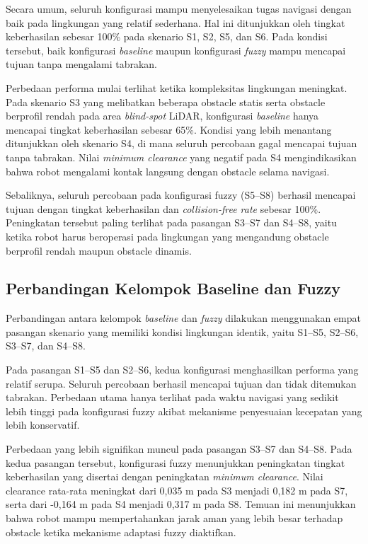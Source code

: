 Secara umum, seluruh konfigurasi mampu menyelesaikan tugas navigasi dengan baik pada lingkungan yang relatif sederhana. Hal ini ditunjukkan oleh tingkat keberhasilan sebesar 100\% pada skenario S1, S2, S5, dan S6. Pada kondisi tersebut, baik konfigurasi \textit{baseline} maupun konfigurasi \textit{fuzzy} mampu mencapai tujuan tanpa mengalami tabrakan.

Perbedaan performa mulai terlihat ketika kompleksitas lingkungan meningkat. Pada skenario S3 yang melibatkan beberapa obstacle statis serta obstacle berprofil rendah pada area \textit{blind-spot} LiDAR, konfigurasi \textit{baseline} hanya mencapai tingkat keberhasilan sebesar 65\%. Kondisi yang lebih menantang ditunjukkan oleh skenario S4, di mana seluruh percobaan gagal mencapai tujuan tanpa tabrakan. Nilai \textit{minimum clearance} yang negatif pada S4 mengindikasi\-kan bahwa robot mengalami kontak langsung dengan obstacle selama navigasi.

Sebaliknya, seluruh percobaan pada konfigurasi fuzzy (S5--S8) berhasil mencapai tujuan dengan tingkat keberhasilan dan \textit{collision-free rate} sebesar 100\%. Peningkatan tersebut paling terlihat pada pasangan S3--S7 dan S4--S8, yaitu ketika robot harus beroperasi pada lingkungan yang mengandung obstacle berprofil rendah maupun obstacle dinamis.

\subsection{Perbandingan Kelompok Baseline dan Fuzzy}

Perbandingan antara kelompok \textit{baseline} dan \textit{fuzzy} dilakukan menggunakan empat pasangan skenario yang memiliki kondisi lingkungan identik, yaitu S1--S5, S2--S6, S3--S7, dan S4--S8.

Pada pasangan S1--S5 dan S2--S6, kedua konfigurasi menghasilkan performa yang relatif serupa. Seluruh percobaan berhasil mencapai tujuan dan tidak ditemukan tabrakan. Perbedaan utama hanya terlihat pada waktu navigasi yang sedikit lebih tinggi pada konfigurasi fuzzy akibat mekanisme penyesuaian kecepatan yang lebih konservatif.

Perbedaan yang lebih signifikan muncul pada pasangan S3--S7 dan S4--S8. Pada kedua pasangan tersebut, konfigurasi fuzzy menunjukkan peningkatan tingkat keberhasilan yang disertai dengan peningkatan \textit{minimum clearance}. Nilai clearance rata-rata meningkat dari 0,035 m pada S3 menjadi 0,182 m pada S7, serta dari -0,164 m pada S4 menjadi 0,317 m pada S8. Temuan ini menunjukkan bahwa robot mampu mempertahankan jarak aman yang lebih besar terhadap obstacle ketika mekanisme adaptasi fuzzy diaktifkan.

